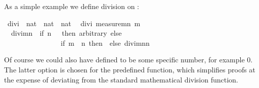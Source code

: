 \begin{isabellebody}
\begin{isamarkuptext}
As a simple example we define division on :%
\end{isamarkuptext}%
\isamarkuptrue%
\ divi\ {\isacharcolon}{\isacharcolon}\ {\isachardoublequote}nat\ {\isasymtimes}\ nat\ {\isasymRightarrow}\ nat{\isachardoublequote}\isanewline
\isamarkupfalse%
\ {\isacharparenleft}\ divi\ {\isachardoublequote}measure{\isacharparenleft}{\isasymlambda}{\isacharparenleft}m{\isacharcomma}n{\isacharparenright}{\isachardot}\ m{\isacharparenright}{\isachardoublequote}\isanewline
\ \ {\isachardoublequote}divi{\isacharparenleft}m{\isacharcomma}n{\isacharparenright}\ {\isacharequal}\ {\isacharparenleft}if\ n\ {\isacharequal}\ {}\ then\ arbitrary\ else\isanewline
\ \ \ \ \ \ \ \ \ \ \ \ \ \ \ \ if\ m\ {\isacharless}\ n\ then\ {}\ else\ divi{\isacharparenleft}m{\isacharminus}n{\isacharcomma}n{\isacharparenright}{\isacharplus}{}{\isacharparenright}{\isachardoublequote}\isamarkupfalse%
%
\begin{isamarkuptext}%
\noindent Of course we could also have defined
 to be some specific number, for example 0. The
latter option is chosen for the predefined  function, which
simplifies proofs at the expense of deviating from the
standard mathematical division function.


\end{isamarkuptext}
\end{isabellebody}
